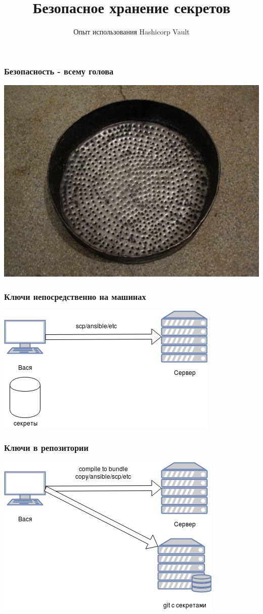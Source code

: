 \documentclass[mathserif,serif]{beamer}
\title[Безопасное хранение секретов]
{Безопасное хранение секретов}
\subtitle{Опыт использования Hashicorp Vault}
\date
{}
\begin{document}
\frame{\titlepage}

\begin{frame}
	\frametitle{Безопасность - всему голова}
	\includegraphics[width=\linewidth]{sieve.jpg}
\end{frame}

\begin{frame}
	\frametitle{Ключи непосредственно на машинах}
	\includegraphics[width=\linewidth]{primitive1.png}
\end{frame}

\begin{frame}
	\frametitle{Ключи в репозитории}
	\includegraphics[width=\linewidth]{primitive2.png}
\end{frame}
\end{document}

